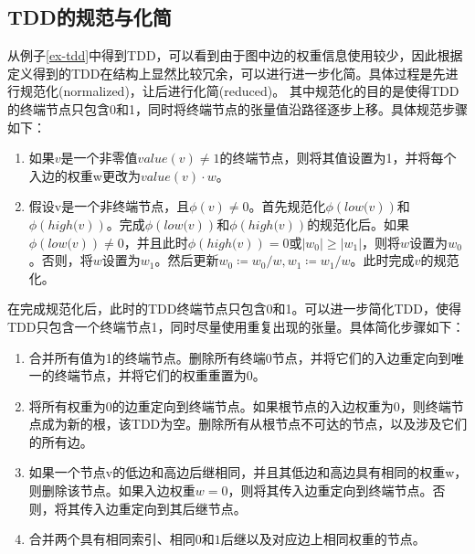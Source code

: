\subsection{TDD的规范与化简}
从例子\ref{ex-tdd}中得到TDD，可以看到由于图中边的权重信息使用较少，因此根据定义得到的TDD在结构上显然比较冗余，可以进行进一步化简。具体过程是先进行规范化(normalized)，让后进行化简(reduced)\citep{Hong_2022}。
其中规范化的目的是使得TDD的终端节点只包含0和1，同时将终端节点的张量值沿路径逐步上移。具体规范步骤如下：
\begin{enumerate}
    \item 如果$v$是一个非零值$value\left(v\right)\neq 1$的终端节点，则将其值设置为1，并将每个入边的权重w更改为$value\left(v\right)\cdot w$。\label{norm1}
    \item 假设v是一个非终端节点，且$\phi\left(v\right)\neq 0$。首先规范化$\phi\left.\left(low(v\right)\right)$和$\phi\left.\left(high(v\right)\right)$。完成$\phi\left.\left(low(v\right)\right)$和$\phi\left.\left(high(v\right)\right)$的规范化后。如果$\phi\left.\left(low(v\right)\right)\neq 0$，并且此时$\phi\left.\left(high(v\right)\right)=0$或$\left|w_0\right|\geq\left|w_1\right|$，则将$w$设置为$w_0$。否则，将$w$设置为$w_1$。然后更新$w_0≔w_0/w,w_1≔w_1/w$。此时完成$v$的规范化。\label{norm2}
\end{enumerate}



在完成规范化后，此时的TDD终端节点只包含0和1。可以进一步简化TDD，使得TDD只包含一个终端节点1，同时尽量使用重复出现的张量。具体简化步骤如下：
\begin{enumerate}
    \item 	合并所有值为1的终端节点。删除所有终端$0$节点，并将它们的入边重定向到唯一的终端节点，并将它们的权重重置为$0$。\label{sympl1}
	\item 将所有权重为$0$的边重定向到终端节点。如果根节点的入边权重为$0$，则终端节点成为新的根，该TDD为空。删除所有从根节点不可达的节点，以及涉及它们的所有边。\label{sympl2}
	\item 如果一个节点v的低边和高边后继相同，并且其低边和高边具有相同的权重w，则删除该节点。如果入边权重$w=0$，则将其传入边重定向到终端节点。否则，将其传入边重定向到其后继节点。\label{sympl3}
	\item 合并两个具有相同索引、相同$0$和$1$后继以及对应边上相同权重的节点。\label{sympl4}
\end{enumerate}

